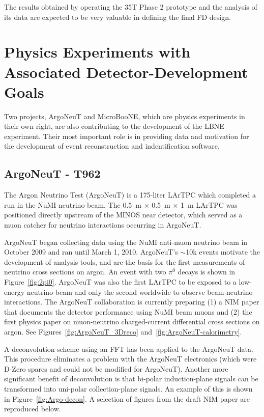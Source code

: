 The results obtained by operating the 35T Phase 2 prototype and the analysis of its data are expected
to be very valuable in defining the final FD design. 


\section{Physics Experiments with Associated Detector-Development Goals}

Two projects, ArgoNeuT and MicroBooNE,  which are physics experiments in their own right, are also contributing to the development of the LBNE experiment. Their most important role is in providing data and motivation for the development of event reconstruction and indentification software.

\subsection{ArgoNeuT - T962}
The Argon Neutrino Test (ArgoNeuT) is a 175-liter LArTPC which completed a run in the NuMI neutrino beam.  The 0.5~m $\times$ 0.5~m $\times$ 1~m LArTPC was positioned directly upstream of the MINOS near detector, which served as a muon catcher for neutrino interactions occurring in ArgoNeuT. 

ArgoNeuT began collecting data using the NuMI anti-muon neutrino beam in October 2009 and ran until  March 1, 2010.  ArgoNeuT's $\sim$10k events motivate the development of analysis tools, and are the basis for the first measurements of neutrino cross sections on argon.   An event with two $\pi^{0}$ decays is shown in Figure~\ref{fig:2pi0}.   ArgoNeuT was also the first LArTPC to be exposed to a low-energy neutrino beam and only the second worldwide to observe beam-neutrino interactions. The ArgoNeuT collaboration is currently preparing (1) a NIM paper that documents the detector performance using NuMI beam muons and (2) the first physics paper on muon-neutrino charged-current differential cross sections on argon.  See Figures~\ref{fig:ArgoNeuT_3Dreco} and~\ref{fig:ArgoNeuT-calorimetry}.

A deconvolution scheme using an FFT has been applied to the ArgoNeuT data. This procedure eliminates a problem with the ArgoNeuT electronics (which were D-Zero spares and could not be modified for ArgoNeuT). Another more significant benefit of deconvolution is that bi-polar induction-plane signals can be transformed into uni-polar collection-plane signals. An example of this is shown in Figure~\ref{fig:Argo-decon}. A selection of figures from the draft NIM paper are reproduced below.


